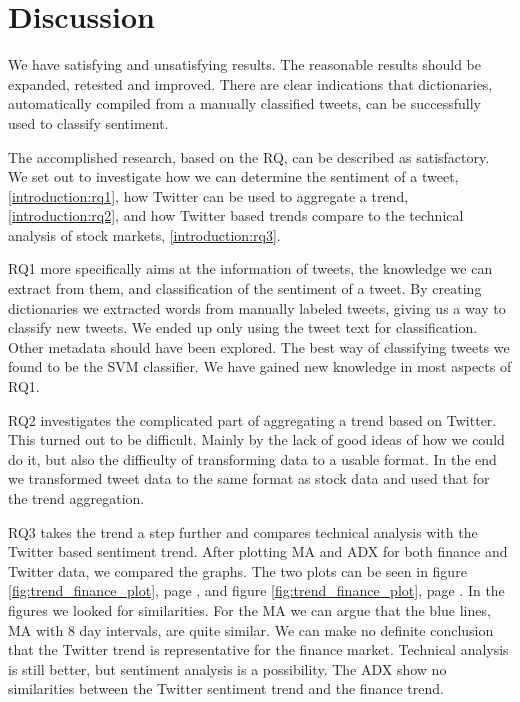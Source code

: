 \section{Discussion}\label{results:discussion}
We have satisfying and unsatisfying results. The
reasonable results should be expanded, retested and improved. 
There are clear indications that dictionaries, automatically compiled
from a manually classified tweets, can be successfully used to classify
sentiment.

The accomplished research, based on the RQ, can be described
as satisfactory. We set out to investigate how we can determine the sentiment of
a tweet, \ref{introduction:rq1}, how Twitter can be used to aggregate a trend,
\ref{introduction:rq2}, and how Twitter based trends compare to the technical
analysis of stock markets, \ref{introduction:rq3}. 

RQ1 more specifically aims at the information of tweets, the knowledge we
can extract from them, and classification of the sentiment of a tweet. By
creating dictionaries we extracted words from manually labeled tweets, giving us
a way to classify new tweets. We ended up only using the tweet text for
classification. Other metadata should have been explored. The best way of
classifying tweets we found to be the SVM classifier. We have gained new
knowledge in most aspects of RQ1. 
 
RQ2 investigates the complicated part of aggregating a trend based on Twitter. This
turned out to be difficult. Mainly by the lack of good ideas of how we could do
it, but also the difficulty of transforming data to a usable format. In the end
we transformed tweet data to the same format as stock data and used that for
the trend aggregation. 

RQ3 takes the trend a step further and compares technical analysis with the
Twitter based sentiment trend. After plotting MA and ADX for both finance and
Twitter data, we compared the graphs. The two plots
can be seen in figure \ref{fig:trend_finance_plot}, page
\pageref{fig:trend_finance_plot}, and figure \ref{fig:trend_finance_plot}, page
\pageref{fig:trend_finance_plot}. In the figures we looked for similarities.
For the MA we can argue that the blue lines, MA with 8
day intervals, are quite similar. We can make no definite conclusion
that the Twitter trend is representative for the finance market. Technical
analysis is still better, but sentiment analysis is a possibility. 
The ADX show no similarities between the Twitter sentiment trend and the finance
trend. 
%
